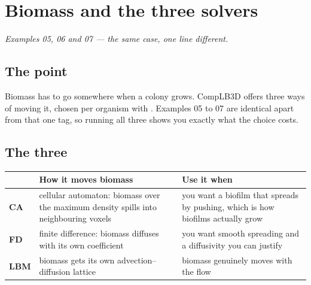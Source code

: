 \chapter{Biomass and the three solvers}
\label{ch:biomass}

\emph{Examples 05, 06 and 07 --- the same case, one line different.}

\section{The point}

Biomass has to go somewhere when a colony grows. CompLB3D offers three ways of
moving it, chosen per organism with . Examples 05 to 07 are
identical apart from that one tag, so running all three shows you exactly what
the choice costs.

\section{The three}

\begin{center}
\begin{tabular}{@{}p{1.5cm}p{6.2cm}p{6.9cm}@{}}
\toprule
& \textbf{How it moves biomass} & \textbf{Use it when}\\
\midrule
\textbf{CA} & cellular automaton: biomass over the maximum density spills into neighbouring voxels & you want a biofilm that spreads by pushing, which is how biofilms actually grow\\
\textbf{FD} & finite difference: biomass diffuses with its own coefficient & you want smooth spreading and a diffusivity you can justify\\
\textbf{LBM} & biomass gets its own advection--diffusion lattice & biomass genuinely moves with the flow\\
\bottomrule
\end{tabular}
\end{center}

\begin{center}
\end{center}


